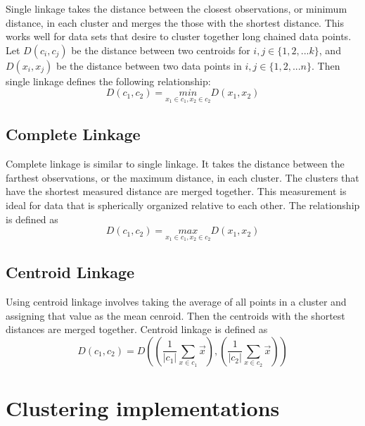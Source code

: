 \documentclass[../tech_report_1.tex]{subfiles}
\begin{document}
Single linkage takes the distance between the closest observations,
or minimum distance, in each cluster and merges the those with the
shortest distance. This works well for data sets that desire to cluster
together long chained data points. Let $D(c_i,c_j)$ be the distance between two centroids for $i,j \in \{1, 2, ... k\}$, and $D(x_i, x_j)$ be the distance between two data points in $i, j \in \{ 1, 2, ... n \}$. Then single linkage defines the following relationship:
\begin{equation}
D(c_{1},c_{2})=\underset{x_{1}\in c_{1},x_{2}\in c_{2}}{min}D(x_{1},x_{2})
\end{equation}



\subsection{Complete Linkage}

Complete linkage is similar to single linkage. It takes the distance
between the farthest observations, or the maximum distance, in each
cluster. The clusters that have the shortest measured distance are
merged together. This measurement is ideal for data that is spherically
organized relative to each other. The relationship is defined as
\begin{equation}
D(c_{1},c_{2})=\underset{x_{1}\in c_{1},x_{2}\in c_{2}}{max}D(x_{1},x_{2})
\end{equation}



\subsection{Centroid Linkage}

Using centroid linkage involves taking the average of all points in
a cluster and assigning that value as the mean cenroid. Then
the centroids with the shortest distances are merged together.
Centroid linkage is defined as
\begin{equation}
D(c_{1},c_{2})
=
D\left(
  \left(\frac{1}{|c_{1}|}\sum_{x\in c_{1}}\overset{\rightarrow}{x}\right),
  \left(\frac{1}{|c_{2}|}\sum_{x\in c_{2}}\overset{\rightarrow}{x}\right)
\right)
\end{equation}



\section{Clustering implementations}
\end{document}
